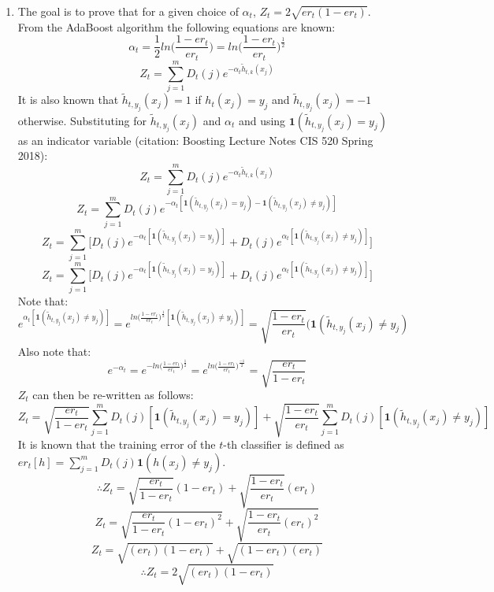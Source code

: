\documentclass[english]{article}
\begin{document}
\begin{enumerate}
    \item The goal is to prove that for a given choice of $\alpha_t$, $Z_t = 2\sqrt{er_t(1 - er_t)}$. \\
    From the AdaBoost algorithm the following equations are known: 
    $$\alpha_t = \frac{1}{2} ln\bigg(\frac{1 - er_t}{er_t}\bigg) = ln\bigg(\frac{1 - er_t}{er_t}\bigg)^{\frac{1}{2}}$$
    $$Z_t = \sum_{j=1}^{m} D_t(j) e^{-\alpha_t\widetilde{h}_{t,k}(x_j)}$$ 
    It is also known that $\widetilde{h}_{t,y_j}(x_j) = 1$ if $h_t(x_j) = y_j$ and $\widetilde{h}_{t,y_j}(x_j) = -1$ otherwise. Substituting for $\widetilde{h}_{t,y_j}(x_j)$ and $\alpha_t$ and using $\textbf{1}(\widetilde{h}_{t,y_j}(x_j) = y_j)$ as an indicator variable (citation: Boosting Lecture Notes CIS 520 Spring 2018): 
    $$Z_t = \sum_{j=1}^{m} D_t(j) e^{-\alpha_t\widetilde{h}_{t,k}(x_j)}$$
    $$Z_t = \sum_{j=1}^{m} D_t(j) e^{-\alpha_t[\textbf{1}(\widetilde{h}_{t,y_j}(x_j) = y_j) - \textbf{1}(\widetilde{h}_{t,y_j}(x_j) \neq y_j)]}$$
    $$Z_t = \sum_{j=1}^{m} \bigg[D_t(j) e^{-\alpha_t[\textbf{1}(\widetilde{h}_{t,y_j}(x_j) = y_j)]} + D_t(j)e^{\alpha_t[\textbf{1}(\widetilde{h}_{t,y_j}(x_j) \neq y_j)]}\bigg]$$
     $$Z_t = \sum_{j=1}^{m} \bigg[ D_t(j) e^{-\alpha_t[\textbf{1}(\widetilde{h}_{t,y_j}(x_j) = y_j)]} + D_t(j)e^{\alpha_t[\textbf{1}(\widetilde{h}_{t,y_j}(x_j) \neq y_j)]}\bigg]$$
     Note that: 
     $$e^{\alpha_t[\textbf{1}(\widetilde{h}_{t,y_j}(x_j) \neq y_j)]} = e^{ln\big(\frac{1 - er_t}{er_t}\big)^{\frac{1}{2}}[\textbf{1}(\widetilde{h}_{t,y_j}(x_j) \neq y_j)]} = \sqrt{\frac{1 - er_t}{er_t}}(\textbf{1}(\widetilde{h}_{t,y_j}(x_j) \neq y_j)$$ 
     Also note that:
     $$e^{-\alpha_t} = e^{-ln\big(\frac{1 - er_t}{er_t}\big)^{\frac{1}{2}}} = e^{ln\big(\frac{1 - er_t}{er_t}\big)^{\frac{-1}{2}}} = \sqrt{\frac{er_t}{1 - er_t}}$$
     $Z_t$ can then be re-written as follows: 
     $$Z_t = \sqrt{\frac{ er_t}{1-er_t}}\sum_{j=1}^{m} D_t(j) [\textbf{1}(\widetilde{h}_{t,y_j}(x_j) = y_j)] + \sqrt{\frac{1 - er_t}{er_t}}\sum_{j=1}^{m} D_t(j)[\textbf{1}(\widetilde{h}_{t,y_j}(x_j) \neq y_j)]$$
     It is known that the training error of the $t$-th classifier is defined as $er_t[h] = \sum_{j=1}^{m} D_t(j) \textbf{1}(h(x_j) \neq y_j)$. 
     $$\therefore Z_t = \sqrt{\frac{er_t}{1 - er_t}}(1 - er_t)+ \sqrt{\frac{1 - er_t}{er_t}}(er_t)$$
     $$Z_t = \sqrt{\frac{er_t}{1 - er_t}(1 - er_t)^2} + \sqrt{\frac{1 - er_t}{er_t}(er_t)^2}$$
     $$Z_t = \sqrt{(er_t)(1 - er_t)} + \sqrt{(1 - er_t)(er_t)}$$
     $$\therefore Z_t = 2\sqrt{(er_t)(1 - er_t)}$$


\end{enumerate}
\end{document}
